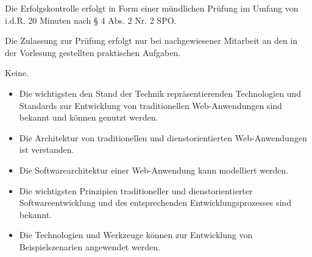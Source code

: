 \begin{course}

\setdoclanguagegerman
{}



\coursehead


\label{cour_14537.dp_997}


\begin{styleenv}
\begin{assessment}
Die Erfolgskontrolle erfolgt in Form einer mündlichen Prüfung im Umfang von i.d.R. 20 Minuten nach § 4 Abs. 2 Nr. 2 SPO.

 

Die Zulassung zur Prüfung erfolgt nur bei nachgewiesener Mitarbeit an den in der Vorlesung gestellten praktischen Aufgaben.


\end{assessment}

\begin{conditions}Keine.\end{conditions}


\end{styleenv}

\begin{learningoutcomes}
\begin{itemize}\item Die wichtigsten den Stand der Technik repräsentierenden Technologien und Standards zur Entwicklung von traditionellen Web-Anwendungen sind bekannt und können genutzt werden.  \item Die Architektur von traditionellen und dienstorientierten Web-Anwendungen ist verstanden.  \item Die Softwarearchitektur einer Web-Anwendung kann modelliert werden.  \item Die wichtigsten Prinzipien traditioneller und dienstorientierter Softwareentwicklung und des entsprechenden Entwicklungsprozesses sind bekannt.  \item Die Technologien und Werkzeuge können zur Entwicklung von Beispielszenarien angewendet werden.  \end{itemize}
\end{learningoutcomes}


\end{course}
